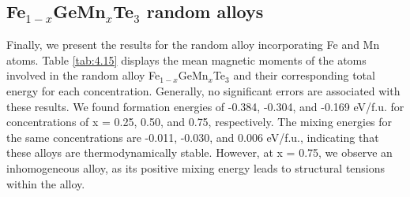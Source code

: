 \subsection{\texorpdfstring{Fe$_{1-x}$GeMn$_{x}$Te$_{3}$ random alloys}{Fe1-xGeMnxTe3 random alloys}}
Finally, we present the results for the random alloy incorporating Fe and Mn atoms. Table \ref{tab:4.15} displays the mean magnetic moments of the atoms involved in the random alloy Fe$_{1-x}$GeMn$_{x}$Te$_{3}$ and their corresponding total energy for each concentration. Generally, no significant errors are associated with these results. We found formation energies of -0.384, -0.304, and -0.169 eV/f.u. for concentrations of x = 0.25, 0.50, and 0.75, respectively. The mixing energies for the same concentrations are -0.011, -0.030, and 0.006 eV/f.u., indicating that these alloys are thermodynamically stable. However, at x = 0.75, we observe an inhomogeneous alloy, as its positive mixing energy leads to structural tensions within the alloy.

